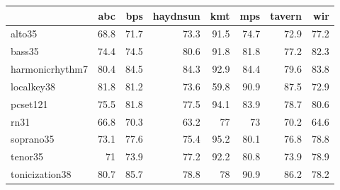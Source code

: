 \begin{tabular}{l|rrrrrrr}
                 & \acrshort{abc}  & \acrshort{bps}  & \acrshort{haydnsun} & \acrshort{kmt} & \acrshort{mps}  & \acrshort{tavern} & \acrshort{wir}  \\ \hline
\gls{alto35}           & 68.8 & 71.7 & 73.3     & 91.5    & 74.7 & 72.9   & 77.2 \\
\gls{bass35}           & 74.4 & 74.5 & 80.6     & 91.8    & 81.8 & 77.2   & 82.3 \\
\gls{harmonicrhythm7}  & 80.4 & 84.5 & 84.3     & 92.9    & 84.4 & 79.6   & 83.8 \\
\gls{localkey38}       & 81.8 & 81.2 & 73.6     & 59.8    & 90.9 & 87.5   & 72.9 \\
\gls{pcset121} & 75.5 & 81.8 & 77.5     & 94.1    & 83.9 & 78.7   & 80.6 \\
\gls{rn31}   & 66.8 & 70.3 & 63.2     & 77      & 73   & 70.2   & 64.6 \\
\gls{soprano35}        & 73.1 & 77.6 & 75.4     & 95.2    & 80.1 & 76.8   & 78.8 \\
\gls{tenor35}          & 71   & 73.9 & 77.2     & 92.2    & 80.8 & 73.9   & 78.9 \\
\gls{tonicization38}   & 80.7 & 85.7 & 78.8     & 78      & 90.9 & 86.2   & 78.2
\end{tabular}
